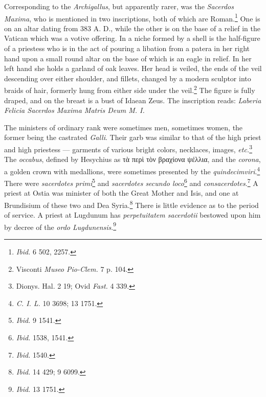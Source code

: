 \documentclass[a4paper, 11pt, oneside, polutonikogreek, english]{article}
\begin{document}
Corresponding to the \emph{Archigallus}, but apparently rarer, was the \emph{Sacerdos Maxima}, who is mentioned in two inscriptions, both of which are Roman.\footnote{\emph{Ibid.} 6 502, 2257.} One is on an altar dating from 383 A. D., while the other is on the base of a relief in the Vatican which was a votive offering. In a niche formed by a shell is the half-figure of a priestess who is in the act of pouring a libation from a patera in her right hand upon a small round altar on the base of which is an eagle in relief. In her left hand she holds a garland of oak leaves. Her head is veiled, the ends of the veil descending over either shoulder, and fillets, changed by a modern sculptor into braids of hair, formerly hung from either side under the veil.\footnote{Visconti \emph{Museo Pio-Clem.} 7 p. 104.} The figure is fully draped, and on the breast is a bust of Idaean Zeus. The inscription reads: \emph{Laberia Felicia Sacerdos Maxima Matris Deum M. I.}

The ministers of ordinary rank were sometimes men, sometimes women, the former being the castrated \emph{Galli}. Their garb was similar to that of the high priest and high priestess --- garments of various bright colors, necklaces, images, \emph{etc.}\footnote{Dionys. Hal. 2 19; Ovid \emph{Fast.} 4 339.} The \emph{occabus}, defined by Hesychius as τὰ περὶ τὸν βραχίονα ψέλλια, and the \emph{corona}, a golden crown with medallions, were sometimes presented by the \emph{quindecimviri}.\footnote{\emph{C. I. L.} 10 3698; 13 1751.} There were \emph{sacerdotes primi}\footnote{\emph{Ibid.} 9 1541.} and \emph{sacerdotes secundo loco}\footnote{\emph{Ibid.} 1538, 1541.} and \emph{consacerdotes}.\footnote{\emph{Ibid.} 1540.} A priest at Ostia was minister of both the Great Mother and Isis, and one at Brundisium of these two and Dea Syria.\footnote{\emph{Ibid.} 14 429; 9 6099.} There is little evidence as to the period of service. A priest at Lugdunum has \emph{perpetuitatem sacerdotii} bestowed upon him by decree of the \emph{ordo Lugdunensis}.\footnote{\emph{Ibid.} 13 1751.}
\end{document}
